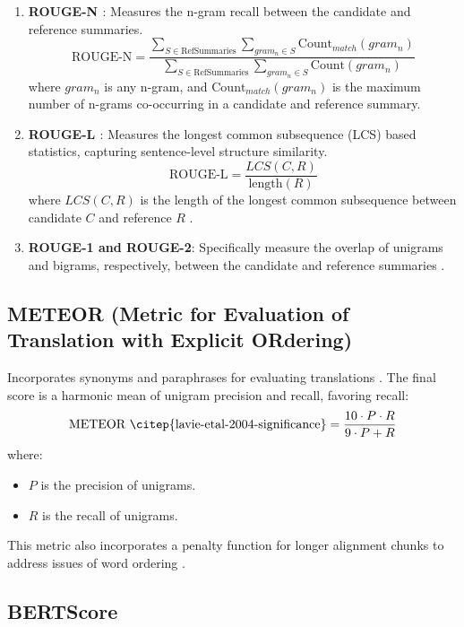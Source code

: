 \begin{enumerate}
    \item \textbf{ROUGE-N \citep{Maples2017TheR}}: Measures the n-gram recall between the candidate and reference summaries.
    \[
    \text{ROUGE-N} = \frac{\sum_{S \in \text{RefSummaries}} \sum_{gram_n \in S} \text{Count}_{match}(gram_n)}{\sum_{S \in \text{RefSummaries}} \sum_{gram_n \in S} \text{Count}(gram_n)}
    \]
    where \( gram_n \) is any n-gram, and \( \text{Count}_{match}(gram_n) \) is the maximum number of n-grams co-occurring in a candidate and reference summary.

    \item \textbf{ROUGE-L \citep{lin-2004-rouge}}: Measures the longest common subsequence (LCS) based statistics, capturing sentence-level structure similarity.
    \[
    \text{ROUGE-L} = \frac{LCS(C, R)}{\text{length}(R)}
    \]
    where \( LCS(C, R) \) is the length of the longest common subsequence between candidate \( C \) and reference \( R \) \citep{Ng2015Better}.

    \item \textbf{ROUGE-1 and ROUGE-2}: Specifically measure the overlap of unigrams and bigrams, respectively, between the candidate and reference summaries \citep{Ganesan2015ROUGE}.
\end{enumerate}

\subsection{METEOR (Metric for Evaluation of Translation with Explicit ORdering)}

Incorporates synonyms and paraphrases for evaluating translations \citep{Agarwal2008Meteor}. The final score is a harmonic mean of unigram precision and recall, favoring recall:
\[
\text{METEOR \citep{lavie-etal-2004-significance}} = \frac{10 \cdot P \cdot R}{9 \cdot P + R}
\]
where:
\begin{itemize}
    \item \( P \) is the precision of unigrams.
    \item \( R \) is the recall of unigrams.
\end{itemize}

This metric also incorporates a penalty function for longer alignment chunks to address issues of word ordering \citep{Agarwal2008Meteor}.

\subsection{BERTScore}

